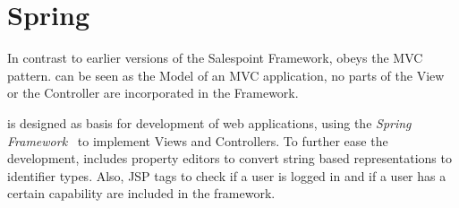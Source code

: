 \section{Spring}
In contrast to earlier versions of the Salespoint Framework, \salespoint{} obeys the MVC pattern. 
\salespoint{} can be seen as the Model of an MVC application, no parts of the View or the Controller are incorporated in the Framework.

\salespoint{} is designed as basis for development of web applications, using the \textit{Spring Framework}~\cite{spring} to implement Views and Controllers.
To further ease the development, \salespoint{} includes property editors to convert string based representations to \salespoint{} identifier types.
Also, JSP tags to check if a user is logged in and if a user has a certain capability are included in the framework.

